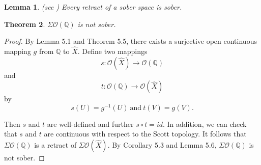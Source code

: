 \documentclass[preprint,12pt]{elsarticle}
\numberwithin{equation}{section}
\newtheorem{theorem}{Theorem}[section]
\newtheorem{lemma}[theorem]{Lemma}
\begin{document}
\begin{lemma}{\rm (see \cite{GG03}) Every retract of a sober space is sober.}
\end{lemma}


\begin{theorem} {\rm $\Sigma\mathcal{O}(\mathbb{Q})$ is not sober.}
\end{theorem}
\begin{proof} By Lemma 5.1 and Theorem 5.5, there exists a surjective open continuous mapping $g$ from $\mathbb{Q}$ to $\widehat{X}$. Define two mappings $$s:\mathcal{O}(\widehat{X})\longrightarrow\mathcal{O}(\mathbb{Q})$$ and $$t:\mathcal{O}(\mathbb{Q})\longrightarrow\mathcal{O}(\widehat{X})$$ by
$$s(U)=g^{-1}(U)\ \mbox{and}\ t(V)=g(V).$$

Then $s$ and $t$ are well-defined and further $s\circ t=id$. In addition, we can check that $s$ and $t$ are continuous with respect to the Scott topology. It follows that $\Sigma\mathcal{O}(\mathbb{Q})$ is a retract of $\Sigma\mathcal{O}(\widehat{X})$. By Corollary 5.3 and Lemma 5.6, $\Sigma\mathcal{O}(\mathbb{Q})$ is not sober.
\end{proof}
\end{document}
